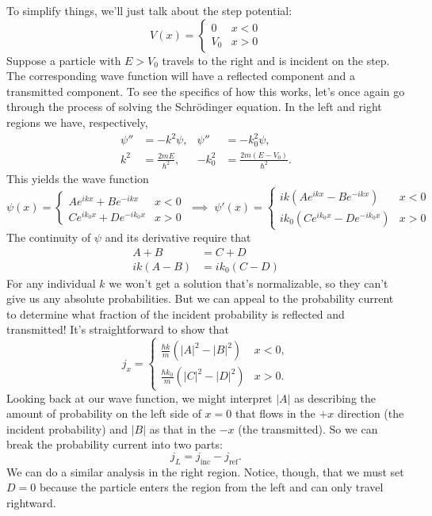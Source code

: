 \documentclass[../p052main.tex]{subfiles}
\begin{document}
To simplify things, we'll just talk about the step potential:
\[ V(x) = \begin{cases} 0 & x < 0 \\ V_0 & x > 0 \end{cases} \]
Suppose a particle with $E > V_0$ travels to the right and is incident on the step.
The corresponding wave function will have a reflected component and a transmitted component.
To see the specifics of how this works, let's once again go through the process of solving the Schrödinger equation.
In the left and right regions we have, respectively,
\begin{align*}
    \psi'' &= -k^2 \psi, & \psi'' &= -k_0^2 \psi, \\
    k^2 &= \frac{2mE}{\hbar^2}, & -k_0^2 &= \frac{2m(E - V_0)}{\hbar^2}.
\end{align*}
This yields the wave function
\[ \psi(x) = \begin{cases} Ae^{ikx} + Be^{-ikx} & x < 0 \\ Ce^{ik_0x} + De^{-ik_0x} & x > 0 \end{cases} \;\implies\; \psi'(x) = \begin{cases} ik(Ae^{ikx} - Be^{-ikx}) & x < 0 \\ ik_0(Ce^{ik_0x} - De^{-ik_0x}) & x > 0 \end{cases} \]
The continuity of $\psi$ and its derivative require that
\begin{align*}
    A + B &= C + D \\
    ik(A - B) &= ik_0(C - D)
\end{align*}
For any individual $k$ we won't get a solution that's normalizable, so they can't give us any absolute probabilities.
But we can appeal to the probability current to determine what fraction of the incident probability is reflected and transmitted!
It's straightforward to show that
\[ j_x = \begin{cases} \frac{\hbar k}{m} \left( |A|^2 - |B|^2 \right) & x < 0, \\ \frac{\hbar k_0}{m} \left( |C|^2 - |D|^2 \right) & x > 0. \end{cases} \]
Looking back at our wave function, we might interpret $|A|$ as describing the amount of probability on the left side of $x=0$ that flows in the $+x$ direction (the incident probability) and $|B|$ as that in the $-x$ (the transmitted).
So we can break the probability current into two parts:
\[ j_L = j_\textrm{inc} - j_\textrm{ref}. \]
We can do a similar analysis in the right region.
Notice, though, that we must set $D = 0$ because the particle enters the region from the left and can only travel rightward.
\end{document}
